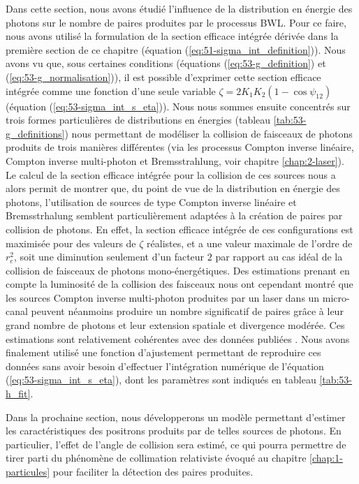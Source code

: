 \begin{refsection}
Dans cette section, nous avons étudié l'influence de la distribution en énergie des photons sur le nombre de paires produites par le processus BWL. Pour ce faire, nous avons utilisé la formulation de la section efficace intégrée dérivée dans la première section de ce chapitre (équation (\ref{eq:51-sigma_int_definition})). Nous avons vu que, sous certaines conditions (équations (\ref{eq:53-g_definition}) et (\ref{eq:53-g_normalisation})), il est possible d'exprimer cette section efficace intégrée comme une fonction d'une seule variable $\zeta=2 K_1 K_2 (1-\cos\psi_{12})$ (équation (\ref{eq:53-sigma_int_s_eta})). Nous nous sommes ensuite concentrés sur trois formes particulières de distributions en énergies (tableau \ref{tab:53-g_definitions}) nous permettant de modéliser la collision de faisceaux de photons produits de trois manières différentes (via les processus Compton inverse linéaire, Compton inverse multi-photon et Bremsstrahlung, voir chapitre \ref{chap:2-laser}). Le calcul de la section efficace intégrée pour la collision de ces sources nous a alors permit de montrer que, du point de vue de la distribution en énergie des photons, l'utilisation de sources de type Compton inverse linéaire et Bremsstrhalung semblent particulièrement adaptées à la création de paires par collision de photons. En effet, la section efficace intégrée de ces configurations est maximisée pour des valeurs de $\zeta$ réalistes, et a une valeur maximale de l'ordre de $r_e^2$, soit une diminution seulement d'un facteur $2$ par rapport au cas idéal de la collision de faisceaux de photons mono-énergétiques. Des estimations prenant en compte la luminosité de la collision des faisceaux nous ont cependant montré que les sources Compton inverse multi-photon produites par un laser dans un micro-canal peuvent néanmoins produire un nombre significatif de paires grâce à leur grand nombre de photons et leur extension spatiale et divergence modérée. Ces estimations sont relativement cohérentes avec des données publiées \parencite{wang_2020, drebot_2017a}.
Nous avons finalement utilisé une fonction d'ajustement permettant de reproduire ces données sans avoir besoin d'effectuer l'intégration numérique de l'équation (\ref{eq:53-sigma_int_s_eta}), dont les paramètres sont indiqués en tableau \ref{tab:53-h_fit}.

Dans la prochaine section, nous développerons un modèle permettant d'estimer les caractéristiques des positrons produits par de telles sources de photons. En particulier, l'effet de l'angle de collision sera estimé, ce qui pourra permettre de tirer parti du phénomène de collimation relativiste évoqué au chapitre \ref{chap:1-particules} pour faciliter la détection des paires produites.


\end{refsection}
